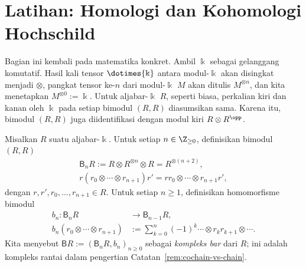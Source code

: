 
\section{Latihan: Homologi dan Kohomologi Hochschild}\label{sec:HH}
\hypertarget{o014.aljabr2.chapter3.exercises-hochschild-homology-and-cohomology}{ }

Bagian ini kembali pada matematika konkret. Ambil $\Bbbk$ sebagai gelanggang
komutatif. Hasil kali tensor $\dotimes{\Bbbk}$ antara modul-$\Bbbk$ akan
disingkat menjadi $\otimes$, pangkat tensor ke-$n$ dari modul-$\Bbbk$ $M$
akan ditulis $M^{\otimes n}$, dan kita menetapkan
$M^{\otimes 0}:=\Bbbk$. Untuk aljabar-$\Bbbk$ $R$, seperti biasa, perkalian
kiri dan kanan oleh $\Bbbk$ pada setiap bimodul $(R,R)$ diasumsikan sama.
Karena itu, bimodul $(R,R)$ juga diidentifikasi dengan modul kiri
$R\otimes R^{\opp}$.

\begin{definisi}\label{def:bar-Hochschild}
	Misalkan $R$ suatu aljabar-$\Bbbk$. Untuk setiap
	$n\in\Z_{\geq 0}$, definisikan bimodul $(R,R)$
	\begin{gather*}
		\mathsf{B}_n R := R \otimes R^{\otimes n} \otimes R = R^{\otimes (n+2)}, \\
		r(r_0 \otimes \cdots \otimes r_{n+1})r'
		= rr_0 \otimes \cdots \otimes r_{n+1} r',
	\end{gather*}
	dengan $r,r',r_0,\ldots,r_{n+1}\in R$. Untuk setiap $n\geq1$,
	definisikan homomorfisme bimodul
	\begin{equation*}\begin{split}
		b_n: \mathsf{B}_n R & \to \mathsf{B}_{n-1} R, \\
		b_n \left( r_0 \otimes \cdots \otimes r_{n+1} \right)
		& := \sum_{k=0}^n (-1)^k
		\cdots \otimes r_k r_{k+1} \otimes \cdots .
	\end{split}\end{equation*}
	Kita menyebut
	$\mathsf{B}R:=\left(\mathsf{B}_nR,b_n\right)_{n\geq0}$ sebagai
	\emph{kompleks bar} dari $R$; ini adalah kompleks rantai dalam
	pengertian Catatan~\ref{rem:cochain-vs-chain}.
\end{definisi}

